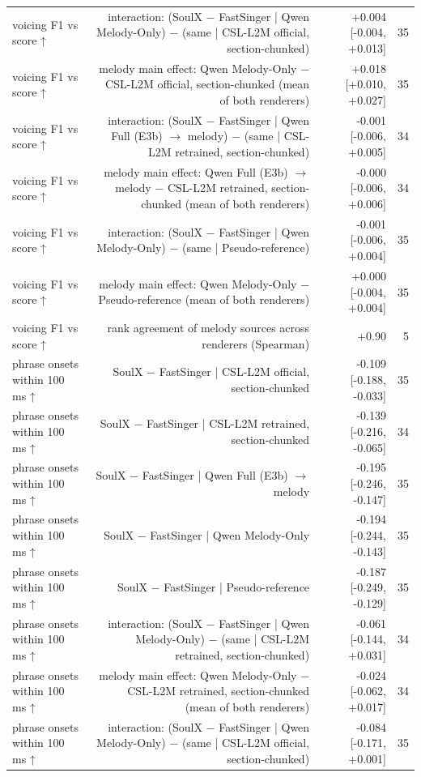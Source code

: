 \begin{table}[t]
\begin{tabular}{lrrr}
voicing F1 vs score ↑ & interaction: (SoulX $-$ FastSinger | Qwen Melody-Only) $-$ (same | CSL-L2M official, section-chunked) & +0.004 [-0.004, +0.013] & 35 \\
voicing F1 vs score ↑ & melody main effect: Qwen Melody-Only $-$ CSL-L2M official, section-chunked (mean of both renderers) & +0.018 [+0.010, +0.027] & 35 \\
voicing F1 vs score ↑ & interaction: (SoulX $-$ FastSinger | Qwen Full (E3b) $\rightarrow$ melody) $-$ (same | CSL-L2M retrained, section-chunked) & -0.001 [-0.006, +0.005] & 34 \\
voicing F1 vs score ↑ & melody main effect: Qwen Full (E3b) $\rightarrow$ melody $-$ CSL-L2M retrained, section-chunked (mean of both renderers) & -0.000 [-0.006, +0.006] & 34 \\
voicing F1 vs score ↑ & interaction: (SoulX $-$ FastSinger | Qwen Melody-Only) $-$ (same | Pseudo-reference) & -0.001 [-0.006, +0.004] & 35 \\
voicing F1 vs score ↑ & melody main effect: Qwen Melody-Only $-$ Pseudo-reference (mean of both renderers) & +0.000 [-0.004, +0.004] & 35 \\
voicing F1 vs score ↑ & rank agreement of melody sources across renderers (Spearman) & +0.90 & 5 \\
phrase onsets within 100 ms ↑ & SoulX $-$ FastSinger | CSL-L2M official, section-chunked & -0.109 [-0.188, -0.033] & 35 \\
phrase onsets within 100 ms ↑ & SoulX $-$ FastSinger | CSL-L2M retrained, section-chunked & -0.139 [-0.216, -0.065] & 34 \\
phrase onsets within 100 ms ↑ & SoulX $-$ FastSinger | Qwen Full (E3b) $\rightarrow$ melody & -0.195 [-0.246, -0.147] & 35 \\
phrase onsets within 100 ms ↑ & SoulX $-$ FastSinger | Qwen Melody-Only & -0.194 [-0.244, -0.143] & 35 \\
phrase onsets within 100 ms ↑ & SoulX $-$ FastSinger | Pseudo-reference & -0.187 [-0.249, -0.129] & 35 \\
phrase onsets within 100 ms ↑ & interaction: (SoulX $-$ FastSinger | Qwen Melody-Only) $-$ (same | CSL-L2M retrained, section-chunked) & -0.061 [-0.144, +0.031] & 34 \\
phrase onsets within 100 ms ↑ & melody main effect: Qwen Melody-Only $-$ CSL-L2M retrained, section-chunked (mean of both renderers) & -0.024 [-0.062, +0.017] & 34 \\
phrase onsets within 100 ms ↑ & interaction: (SoulX $-$ FastSinger | Qwen Melody-Only) $-$ (same | CSL-L2M official, section-chunked) & -0.084 [-0.171, +0.001] & 35 \\

\end{tabular}
\end{table}
